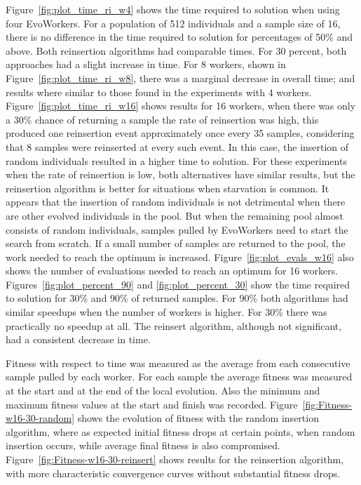 Figure~\ref{fig:plot_time_ri_w4} shows the time required 
to solution when using four EvoWorkers. For a population of
512 individuals and a sample size of 16, there is no
difference in the time required to solution for 
percentages of 50\% and above. Both reinsertion algorithms
had comparable times. For 30 percent, both approaches 
had a slight increase in time. For 8 workers, shown in Figure~\ref{fig:plot_time_ri_w8},  there was a marginal
decrease in overall time; and results where similar to those found in the experiments with 4 workers.  
Figure~\ref{fig:plot_time_ri_w16} shows results for 16 workers,
when there was only a 30\% chance of returning a sample the rate of reinsertion was high, this produced one reinsertion event approximately once every 35 samples,
considering that 8 samples were reinserted at every such event.
In this case, the insertion of random individuals resulted in a higher time to solution.
For these experiments when the rate of reinsertion is low, both alternatives
have similar results, but the reinsertion algorithm is better
for situations when starvation is common.
It appears that the insertion of random individuals is not detrimental when there
are other evolved individuals in the pool. But when the remaining
pool almost consists of random individuals, samples pulled by
EvoWorkers need to start the search from scratch. 
If a small number of samples are returned to the pool, the work needed to reach the
optimum is increased. Figure~\ref{fig:plot_evals_w16} also shows the number 
of evaluations needed to reach an optimum for 16 workers.
Figures~\ref{fig:plot_percent_90} and \ref{fig:plot_percent_30} show
the time required to solution for 30\% and 90\% of returned samples.
For 90\% both algorithms had similar speedups when the number of
workers is higher.
For 30\% there was practically no speedup at all. The reinsert algorithm,
although not significant, had a consistent decrease in time.         

Fitness with respect to time was measured as the average from each consecutive
sample pulled by each worker. For each sample the average fitness
was measured at the start and at the end of the local evolution.
Also the minimum and maximum fitness values at the start and finish was 
recorded.    
Figure~\ref{fig:Fitness-w16-30-random} shows the evolution of fitness
with the random insertion algorithm, where as expected initial fitness drops
at certain points, when random insertion occurs, while average final fitness 
is also compromised. Figure~\ref{fig:Fitness-w16-30-reinsert}
shows results for the reinsertion algorithm, with more
characteristic convergence curves without substantial fitness drops. 





